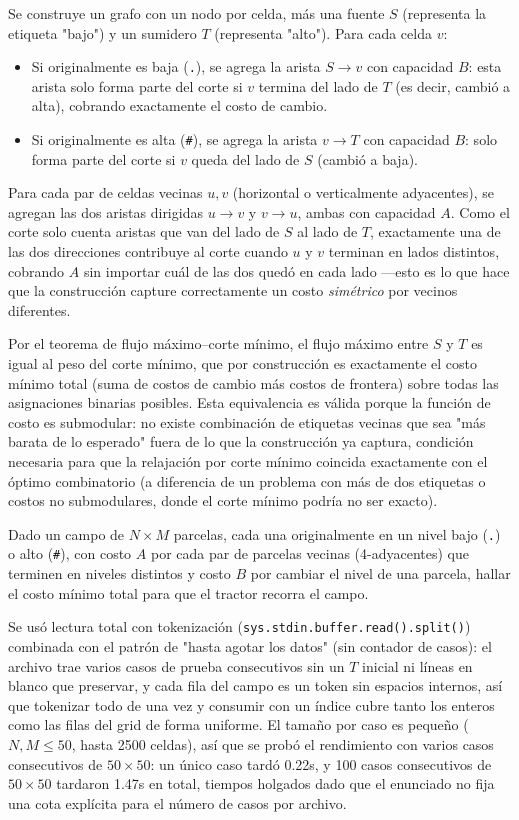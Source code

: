  Se construye un grafo con un nodo por celda, más una fuente $S$ (representa la etiqueta "bajo") y un sumidero $T$ (representa "alto"). Para cada celda $v$:
\begin{itemize}
\item Si originalmente es baja (\texttt{.}), se agrega la arista $S \to v$ con capacidad $B$: esta arista solo forma parte del corte si $v$ termina del lado de $T$ (es decir, cambió a alta), cobrando exactamente el costo de cambio.
\item Si originalmente es alta (\texttt{\#}), se agrega la arista $v \to T$ con capacidad $B$: solo forma parte del corte si $v$ queda del lado de $S$ (cambió a baja).
\end{itemize}
Para cada par de celdas vecinas $u, v$ (horizontal o verticalmente adyacentes), se agregan las dos aristas dirigidas $u \to v$ y $v \to u$, ambas con capacidad $A$. Como el corte solo cuenta aristas que van del lado de $S$ al lado de $T$, exactamente una de las dos direcciones contribuye al corte cuando $u$ y $v$ terminan en lados distintos, cobrando $A$ sin importar cuál de las dos quedó en cada lado —esto es lo que hace que la construcción capture correctamente un costo \emph{simétrico} por vecinos diferentes.

Por el teorema de flujo máximo–corte mínimo, el flujo máximo entre $S$ y $T$ es igual al peso del corte mínimo, que por construcción es exactamente el costo mínimo total (suma de costos de cambio más costos de frontera) sobre todas las asignaciones binarias posibles. Esta equivalencia es válida porque la función de costo es submodular: no existe combinación de etiquetas vecinas que sea "más barata de lo esperado" fuera de lo que la construcción ya captura, condición necesaria para que la relajación por corte mínimo coincida exactamente con el óptimo combinatorio (a diferencia de un problema con más de dos etiquetas o costos no submodulares, donde el corte mínimo podría no ser exacto).


Dado un campo de $N \times M$ parcelas, cada una originalmente en un nivel bajo (\texttt{.}) o alto (\texttt{\#}), con costo $A$ por cada par de parcelas vecinas (4-adyacentes) que terminen en niveles distintos y costo $B$ por cambiar el nivel de una parcela, hallar el costo mínimo total para que el tractor recorra el campo.

 Se usó lectura total con tokenización (\texttt{sys.stdin.buffer.read().split()}) combinada con el patrón de "hasta agotar los datos" (sin contador de casos): el archivo trae varios casos de prueba consecutivos sin un $T$ inicial ni líneas en blanco que preservar, y cada fila del campo es un token sin espacios internos, así que tokenizar todo de una vez y consumir con un índice cubre tanto los enteros como las filas del grid de forma uniforme. El tamaño por caso es pequeño ($N,M \le 50$, hasta 2500 celdas), así que se probó el rendimiento con varios casos consecutivos de $50\times 50$: un único caso tardó 0.22s, y 100 casos consecutivos de $50\times 50$ tardaron 1.47s en total, tiempos holgados dado que el enunciado no fija una cota explícita para el número de casos por archivo.

